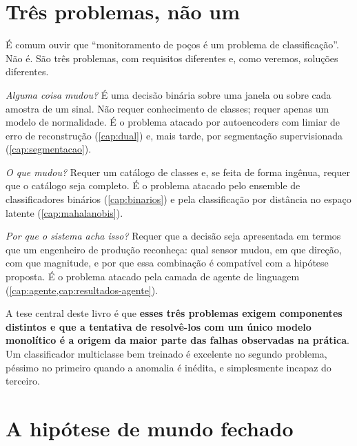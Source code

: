 \section{Três problemas, não um}
\label{sec:introducao-tresproblemas}

É comum ouvir que ``monitoramento de poços é um problema de classificação''. Não é.
São três problemas, com requisitos diferentes e, como veremos, soluções diferentes.

\begin{description}[leftmargin=0pt,style=nextline,itemsep=0.6em]

\item[Detecção.] \emph{Alguma coisa mudou?} É uma decisão binária sobre uma janela ou
sobre cada amostra de um sinal. Não requer conhecimento de classes; requer apenas um
modelo de normalidade. É o problema atacado por autoencoders com limiar de erro de
reconstrução (\cref{cap:dual}) e, mais tarde, por segmentação supervisionada
(\cref{cap:segmentacao}).

\item[Classificação.] \emph{O que mudou?} Requer um catálogo de classes e, se feita de
forma ingênua, requer que o catálogo seja completo. É o problema atacado pelo ensemble
de classificadores binários (\cref{cap:binarios}) e pela classificação por distância no
espaço latente (\cref{cap:mahalanobis}).

\item[Explicação.] \emph{Por que o sistema acha isso?} Requer que a decisão seja
apresentada em termos que um engenheiro de produção reconheça: qual sensor mudou, em
que direção, com que magnitude, e por que essa combinação é compatível com a hipótese
proposta. É o problema atacado pela camada de agente de linguagem
(\cref{cap:agente,cap:resultados-agente}).

\end{description}

A tese central deste livro é que \textbf{esses três problemas exigem componentes
distintos e que a tentativa de resolvê-los com um único modelo monolítico é a origem
da maior parte das falhas observadas na prática}. Um classificador multiclasse bem
treinado é excelente no segundo problema, péssimo no primeiro quando a anomalia é
inédita, e simplesmente incapaz do terceiro.

\section{A hipótese de mundo fechado}

